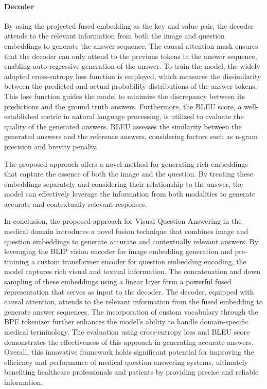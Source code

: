 \documentclass[pdflatex,sn-mathphys-num]{sn-jnl}%
\begin{document}
\paragraph{Decoder}
By using the projected fused embedding as the key and value pair, the decoder attends to the relevant information from both the image and question embeddings to generate the answer sequence. The causal attention mask ensures that the decoder can only attend to the previous tokens in the answer sequence, enabling auto-regressive generation of the answer.
To train the model, the widely adopted cross-entropy loss function is employed, which measures the dissimilarity between the predicted and actual probability distributions of the answer tokens. This loss function guides the model to minimize the discrepancy between its predictions and the ground truth answers. Furthermore, the BLEU score, a well-established metric in natural language processing, is utilized to evaluate the quality of the generated answers. BLEU assesses the similarity between the generated answers and the reference answers, considering factors such as n-gram precision and brevity penalty.

The proposed approach offers a novel method for generating rich embeddings that capture the essence of both the image and the question. By treating these embeddings separately and considering their relationship to the answer, the model can effectively leverage the information from both modalities to generate accurate and contextually relevant responses.

In conclusion, the proposed approach for Visual Question Answering in the medical domain introduces a novel fusion technique that combines image and question embeddings to generate accurate and contextually relevant answers. By leveraging the BLIP vision encoder for image embedding generation and pre-training a custom transformer encoder for question embedding encoding, the model captures rich visual and textual information. The concatenation and down sampling of these embeddings using a linear layer form a powerful fused representation that serves as input to the decoder. The decoder, equipped with causal attention, attends to the relevant information from the fused embedding to generate answer sequences. The incorporation of custom vocabulary through the BPE tokenizer further enhances the model's ability to handle domain-specific medical terminology. The evaluation using cross-entropy loss and BLEU score demonstrates the effectiveness of this approach in generating accurate answers. Overall, this innovative framework holds significant potential for improving the efficiency and performance of medical question-answering systems, ultimately benefiting healthcare professionals and patients by providing precise and reliable information.
\end{document}
